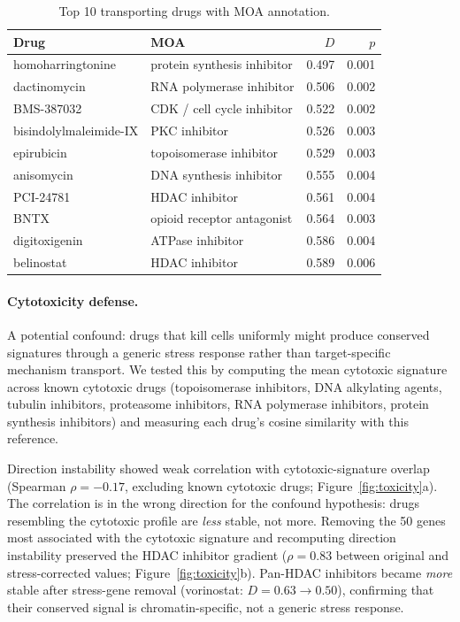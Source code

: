 \documentclass[11pt]{article}
\begin{document}
\begin{table}[t]
\centering
\caption{Top 10 transporting drugs with MOA annotation.}
\label{tab:top}
\small
\begin{tabular}{llrr}
\toprule
Drug & MOA & $D$ & $p$ \\
\midrule
homoharringtonine & protein synthesis inhibitor & 0.497 & 0.001 \\
dactinomycin & RNA polymerase inhibitor & 0.506 & 0.002 \\
BMS-387032 & CDK / cell cycle inhibitor & 0.522 & 0.002 \\
bisindolylmaleimide-IX & PKC inhibitor & 0.526 & 0.003 \\
epirubicin & topoisomerase inhibitor & 0.529 & 0.003 \\
anisomycin & DNA synthesis inhibitor & 0.555 & 0.004 \\
PCI-24781 & HDAC inhibitor & 0.561 & 0.004 \\
BNTX & opioid receptor antagonist & 0.564 & 0.003 \\
digitoxigenin & ATPase inhibitor & 0.586 & 0.004 \\
belinostat & HDAC inhibitor & 0.589 & 0.006 \\
\bottomrule
\end{tabular}
\end{table}

\paragraph{Cytotoxicity defense.}

A potential confound: drugs that kill cells uniformly might produce
conserved signatures through a generic stress response rather than
target-specific mechanism transport. We tested this by computing the
mean cytotoxic signature across known cytotoxic drugs (topoisomerase
inhibitors, DNA alkylating agents, tubulin inhibitors, proteasome
inhibitors, RNA polymerase inhibitors, protein synthesis inhibitors)
and measuring each drug's cosine similarity with this reference.

Direction instability showed weak correlation with cytotoxic-signature
overlap (Spearman $\rho = -0.17$, excluding known cytotoxic drugs;
Figure~\ref{fig:toxicity}a). The correlation is in the wrong direction
for the confound hypothesis: drugs resembling the cytotoxic profile are
\emph{less} stable, not more. Removing the 50 genes most associated with
the cytotoxic signature and recomputing direction instability preserved
the HDAC inhibitor gradient ($\rho = 0.83$ between original and
stress-corrected values; Figure~\ref{fig:toxicity}b). Pan-HDAC
inhibitors became \emph{more} stable after stress-gene removal
(vorinostat: $D = 0.63 \to 0.50$), confirming that their conserved
signal is chromatin-specific, not a generic stress response.
\end{document}
